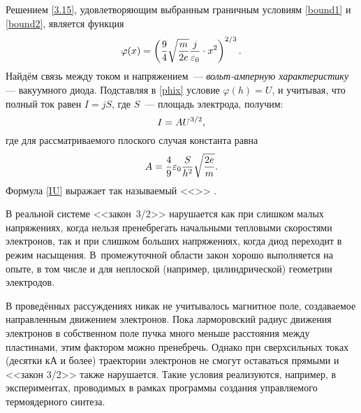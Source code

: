Решением \eqref{3.15}, удовлетворяющим выбранным граничным условиям
\eqref{bound1} и \eqref{bound2},
является функция
\begin{equation}
\eqmark{phix}
    \varphi(x) = 
    \left(
    \frac{9}{4}\sqrt{\frac{m}{2e}}\frac{j}{\varepsilon_0} \cdot x^2
    \right)^{2/3}.
\end{equation}
Найдём связь между током и напряжением~---
\emph{вольт-амперную характеристику} --- вакуумного диода.
Подставляя в \eqref{phix} условие $\varphi(h)=U$, 
и учитывая, что полный ток равен $I=jS$, 
где $S$~--- площадь электрода, получим:
\begin{equation}
\eqmark{IU}
    I = A U^{3/2},
\end{equation}
где для рассматриваемого плоского случая константа равна 
\begin{equation}\eqmark{IU_flat}
A=\frac{4}{9}\varepsilon_0\frac{S}{h^2}\sqrt{\frac{2e}{m}}.
\end{equation}
Формула \eqref{IU} выражает так называемый <<>> .


В реальной системе <<закон~3/2>>
нарушается как при слишком малых напряжениях, когда нельзя пренебрегать
начальными тепловыми скоростями электронов, так и при слишком больших
напряжениях, когда диод переходит в режим насыщения. В~промежуточной
области закон хорошо выполняется на опыте, в том числе и для
неплоской (например, цилиндрической) геометрии электродов.

\begin{lab:note}
В проведённых рассуждениях никак не учитывалось магнитное поле, создаваемое
направленным движением электронов. 
Пока ларморовский радиус движения электронов в собственном поле пучка 
много меньше расстояния между пластинами, этим фактором можно пренебречь.
Однако при сверхсильных токах (десятки кА и более) траектории 
электронов не смогут оставаться прямыми и <<закон 3/2>> также нарушается.
Такие условия реализуются, например, в экспериментах, проводимых
в рамках программы создания управляемого термоядерного синтеза.
\end{lab:note}


